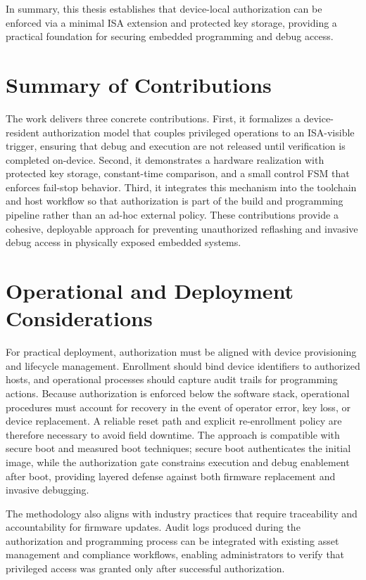 In summary, this thesis establishes that device-local authorization can be enforced via a minimal
ISA extension and protected key storage, providing a practical foundation for securing embedded
programming and debug access.

\section{Summary of Contributions}
The work delivers three concrete contributions. First, it formalizes a device-resident
authorization model that couples privileged operations to an ISA-visible trigger, ensuring that
debug and execution are not released until verification is completed on-device. Second, it
demonstrates a hardware realization with protected key storage, constant-time comparison, and a
small control FSM that enforces fail-stop behavior. Third, it integrates this mechanism into the
toolchain and host workflow so that authorization is part of the build and programming pipeline
rather than an ad-hoc external policy. These contributions provide a cohesive, deployable
approach for preventing unauthorized reflashing and invasive debug access in physically exposed
embedded systems.

\section{Operational and Deployment Considerations}
For practical deployment, authorization must be aligned with device provisioning and lifecycle
management. Enrollment should bind device identifiers to authorized hosts, and operational
processes should capture audit trails for programming actions. Because authorization is enforced
below the software stack, operational procedures must account for recovery in the event of
operator error, key loss, or device replacement. A reliable reset path and explicit re-enrollment
policy are therefore necessary to avoid field downtime. The approach is compatible with secure
boot and measured boot techniques; secure boot authenticates the initial image, while the
authorization gate constrains execution and debug enablement after boot, providing layered
defense against both firmware replacement and invasive debugging.

The methodology also aligns with industry practices that require traceability and accountability
for firmware updates. Audit logs produced during the authorization and programming process can be
integrated with existing asset management and compliance workflows, enabling administrators to
verify that privileged access was granted only after successful authorization.


